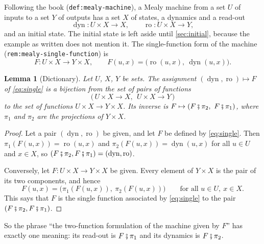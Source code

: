 \documentclass[11pt,a4paper]{article}
\theoremstyle{plain}
\newtheorem{lemma}{Lemma}
\theoremstyle{remark}
\DeclareMathOperator{\dyn}{dyn}
\DeclareMathOperator{\ro}{ro}
\newcommand{\then}{\mathbin{\fatsemi}}
\newcommand{\lbl}[1]{\nolinkurl{#1}}
\begin{document}
Following the book (\lbl{def:mealy-machine}), a Mealy machine from a set $U$ of inputs to a set $Y$ of outputs has a set $X$ of states, a dynamics and a read-out
\begin{equation}
    \dyn \colon U \times X \to X, \qquad \ro \colon U \times X \to Y,
\end{equation}
and an initial state.
The initial state is left aside until \cref{sec:initial}, because the example as written does not mention it.
The single-function form of the machine (\lbl{rem:mealy-single-function}) is
\begin{equation}
    \label{eq:single}
    F \colon U \times X \to Y \times X, \qquad F(u, x) = \bigl(\ro(u, x),\ \dyn(u, x)\bigr).
\end{equation}

\begin{lemma}[Dictionary]
    \label{lem:dictionary}
    Let $U$, $X$, $Y$ be sets.
    The assignment $(\dyn, \ro) \mapsto F$ of \cref{eq:single} is a bijection from the set of pairs of functions
    \begin{equation*}
        \bigl(\, U \times X \to X,\ \ U \times X \to Y \,\bigr)
    \end{equation*}
    to the set of functions $U \times X \to Y \times X$.
    Its inverse is $F \mapsto (F \then \pi_2,\ F \then \pi_1)$, where $\pi_1$ and $\pi_2$ are the projections of $Y \times X$.
\end{lemma}

\begin{proof}
    Let a pair $(\dyn, \ro)$ be given, and let $F$ be defined by \cref{eq:single}.
    Then $\pi_1(F(u, x)) = \ro(u, x)$ and $\pi_2(F(u, x)) = \dyn(u, x)$ for all $u \in U$ and $x \in X$, so $(F \then \pi_2, F \then \pi_1) = (\dyn, \ro)$.

    Conversely, let $F \colon U \times X \to Y \times X$ be given.
    Every element of $Y \times X$ is the pair of its two components, and hence
    \begin{equation*}
        F(u, x) = \bigl(\pi_1(F(u, x)),\ \pi_2(F(u, x))\bigr) \qquad \text{for all } u \in U,\ x \in X.
    \end{equation*}
    This says that $F$ is the single function associated by \cref{eq:single} to the pair $(F \then \pi_2, F \then \pi_1)$.
\end{proof}

So the phrase ``the two-function formulation of the machine given by $F$'' has exactly one meaning: its read-out is $F \then \pi_1$ and its dynamics is $F \then \pi_2$.
\end{document}
